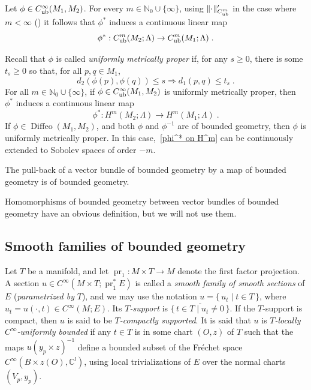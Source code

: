 \documentclass{memo-l}
\theoremstyle{plain}
\theoremstyle{definition}
\theoremstyle{remark}
\newcommand{\C}{\mathbb{C}}
\newcommand{\N}{\mathbb{N}}
\newcommand{\Diffeo}{\operatorname{Diffeo}}
\newcommand{\pr}{\operatorname{pr}}
\newcommand{\Cinftyub}{C^\infty_{\text{\rm ub}}}
\numberwithin{section}{chapter}
\numberwithin{equation}{section}%
\begin{document}
Let $\phi\in \Cinftyub(M_1,M_2)$. For every $m\in\N_0\cup\{\infty\}$, using $\|{\cdot}\|'_{C^m_{\text{\rm ub}}}$ in the case where $m<\infty$ () it follows that $\phi^*$ induces a continuous linear map \cite[Eq.~(19)]{AlvKordyLeichtnam2020}
\begin{equation}\label{phi^* on C_ub^m}
\phi^*:C_{\text{\rm ub}}^m(M_2;\Lambda)
\to C_{\text{\rm ub}}^m(M_1;\Lambda)\;.
\end{equation}

Recall that $\phi$ is called \emph{uniformly metrically proper} if, for any $s\ge0$, there is some $t_s\ge0$ so that, for all $p,q\in M_1$,
\[
d_2(\phi(p),\phi(q)) \le s \Rightarrow d_1(p,q) \le t_s\;.
\]
For all $m\in\N_0\cup\{\infty\}$, if $\phi\in \Cinftyub(M_1,M_2)$ is uniformly metrically proper, then $\phi^*$ induces a continuous linear map \cite[Eq.~(21)]{AlvKordyLeichtnam2020}
\begin{equation}\label{phi^* on H^m}
\phi^*:H^m(M_2;\Lambda)\to H^m(M_1;\Lambda)\;.
\end{equation}
If $\phi\in\Diffeo(M_1,M_2)$, and both $\phi$ and $\phi^{-1}$ are of bounded geometry, then $\phi$ is uniformly metrically proper. In this case,~\eqref{phi^* on H^m} can be continuously extended to Sobolev spaces of order $-m$.

The pull-back of a vector bundle of bounded geometry by a map of bounded geometry is of bounded geometry.

Homomorphisms of bounded geometry between vector bundles of bounded geometry have an obvious definition, but we will not use them.



\subsection{Smooth families of bounded geometry}\label{ss: families of bd geom}

Let $T$ be a manifold, and let $\pr_1:M\times T\to M$ denote the first factor projection. A section $u\in C^\infty(M\times T;\pr_1^*E)$ is called a \emph{smooth family of smooth sections} of $E$ (\emph{parametrized by} $T$), and we may use the notation $u=\{\,u_t\mid t\in T\,\}$, where $u_t=u(\cdot,t)\in C^\infty(M;E)$. Its \emph{$T$-support} is $\overline{\{\,t\in T\mid u_t\ne0\,\}}$. If the $T$-support is compact, then $u$ is said to be \emph{$T$-compactly supported}. It is said that $u$ is \emph{$T$-locally $C^\infty$-uniformly bounded} if any $t\in T$ is in some chart $(O,z)$ of $T$ such that the maps $u(y_p\times z)^{-1}$ define a bounded subset of the Fr\'echet space $C^\infty(B\times z(O),\C^l)$, using local trivializations of $E$ over the normal charts $(V_p,y_p)$. 
\end{document}
